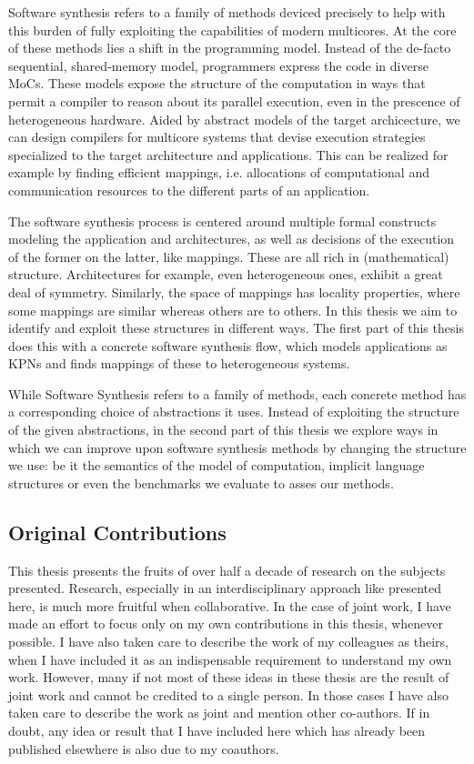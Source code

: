 Software synthesis refers to a family of methods deviced precisely to help with this burden of fully exploiting the capabilities of modern multicores. At the core of these methods lies a shift in the programming model. Instead of the de-facto sequential, shared-memory model, programmers express the code in diverse \acp{MoC}. These models expose the structure of the computation in ways that permit a compiler to reason about its parallel execution, even in the prescence of heterogeneous hardware. Aided by abstract models of the target archicecture, we can design compilers for multicore systems that devise execution strategies specialized to the target architecture and applications. This can be realized for example by finding efficient mappings, i.e. allocations of computational and communication resources to the different parts of an application.

The software synthesis process is centered around multiple formal constructs modeling the application and architectures, as well as decisions of the execution of the former on the latter, like mappings.
These are all rich in (mathematical) structure. Architectures for example, even heterogeneous ones, exhibit a great deal of symmetry. Similarly, the space of mappings has locality properties, where some mappings are similar whereas others are to others. In this thesis we aim to identify and exploit these structures in different ways. The first part of this thesis does this with a concrete software synthesis flow, which models applications as \acp{KPN} and finds mappings of these to heterogeneous systems.

While Software Synthesis refers to a family of methods, each concrete method has a corresponding choice of abstractions it uses. Instead of exploiting the structure of the given abstractions, in the second part of this thesis we explore ways in which we can improve upon software synthesis methods by changing the structure we use: be it the semantics of the model of computation, implicit language structures or even the benchmarks we evaluate to asses our methods.

\subsection*{Original Contributions}
This thesis presents the fruits of over half a decade of research on the subjects presented. Research, especially in an interdisciplinary approach like presented here, is much more fruitful when collaborative.
In the case of joint work, I have made an effort to focus only on my own contributions in this thesis, whenever possible.
I have also taken care to describe the work of my colleagues as theirs, when I have included it as an indispensable requirement to understand my own work.
However,  many if not most of these ideas in these thesis are the result of joint work and cannot be credited to a single person.
In those cases I have also taken care to describe the work as joint and mention other co-authors.
If in doubt, any idea or result that I have included here which has already been published elsewhere is also due to my coauthors.

